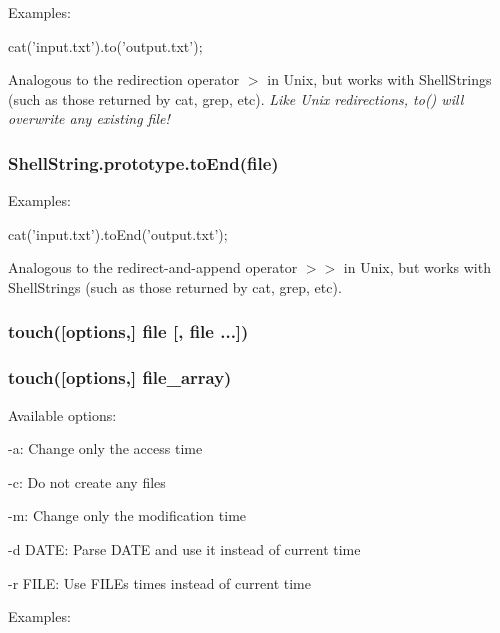 Examples\+:


\begin{DoxyCode}
cat('input.txt').to('output.txt');
\end{DoxyCode}


Analogous to the redirection operator {\ttfamily $>$} in Unix, but works with Shell\+Strings (such as those returned by {\ttfamily cat}, {\ttfamily grep}, etc). {\itshape Like Unix redirections, {\ttfamily to()} will overwrite any existing file!}

\subsubsection*{Shell\+String.\+prototype.\+to\+End(file)}

Examples\+:


\begin{DoxyCode}
cat('input.txt').toEnd('output.txt');
\end{DoxyCode}


Analogous to the redirect-\/and-\/append operator {\ttfamily $>$$>$} in Unix, but works with Shell\+Strings (such as those returned by {\ttfamily cat}, {\ttfamily grep}, etc).

\subsubsection*{touch(\mbox{[}options,\mbox{]} file \mbox{[}, file ...\mbox{]})}

\subsubsection*{touch(\mbox{[}options,\mbox{]} file\+\_\+array)}

Available options\+:


\begin{DoxyItemize}
\item {\ttfamily -\/a}\+: Change only the access time
\item {\ttfamily -\/c}\+: Do not create any files
\item {\ttfamily -\/m}\+: Change only the modification time
\item {\ttfamily -\/d D\+A\+TE}\+: Parse D\+A\+TE and use it instead of current time
\item {\ttfamily -\/r F\+I\+LE}\+: Use F\+I\+LE\textquotesingle{}s times instead of current time
\end{DoxyItemize}

Examples\+:


